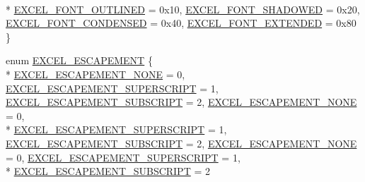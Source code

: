 \begin{DoxyCompactItemize}
\\*
\hyperlink{namespace_excel_format_a667f2d7917ef20f836e5cfec93751d05a2593d75f9c88ca21078192e3bb449d5e}{E\+X\+C\+E\+L\+\_\+\+F\+O\+N\+T\+\_\+\+O\+U\+T\+L\+I\+N\+E\+D} = 0x10, 
\hyperlink{namespace_excel_format_a667f2d7917ef20f836e5cfec93751d05a04f9f154a8b707dc0549db13a4078ec4}{E\+X\+C\+E\+L\+\_\+\+F\+O\+N\+T\+\_\+\+S\+H\+A\+D\+O\+W\+E\+D} = 0x20, 
\hyperlink{namespace_excel_format_a667f2d7917ef20f836e5cfec93751d05a9b5828572d3fdc91a6a4a91789c32602}{E\+X\+C\+E\+L\+\_\+\+F\+O\+N\+T\+\_\+\+C\+O\+N\+D\+E\+N\+S\+E\+D} = 0x40, 
\hyperlink{namespace_excel_format_a667f2d7917ef20f836e5cfec93751d05ac53f1f7b8da98ff92d4a8e91602f4d47}{E\+X\+C\+E\+L\+\_\+\+F\+O\+N\+T\+\_\+\+E\+X\+T\+E\+N\+D\+E\+D} = 0x80
 \}
\item 
enum \hyperlink{namespace_excel_format_a416dbaab3e15b5771ae63a846985407c}{E\+X\+C\+E\+L\+\_\+\+E\+S\+C\+A\+P\+E\+M\+E\+N\+T} \{ \\*
\hyperlink{namespace_excel_format_a416dbaab3e15b5771ae63a846985407ca23fa04d3acf1a8b11238451821947a67}{E\+X\+C\+E\+L\+\_\+\+E\+S\+C\+A\+P\+E\+M\+E\+N\+T\+\_\+\+N\+O\+N\+E} = 0, 
\hyperlink{namespace_excel_format_a416dbaab3e15b5771ae63a846985407ca056e291d587c717a82bdbdc2b030be41}{E\+X\+C\+E\+L\+\_\+\+E\+S\+C\+A\+P\+E\+M\+E\+N\+T\+\_\+\+S\+U\+P\+E\+R\+S\+C\+R\+I\+P\+T} = 1, 
\hyperlink{namespace_excel_format_a416dbaab3e15b5771ae63a846985407ca7328578cb7e58b42577bb67bf4a929b4}{E\+X\+C\+E\+L\+\_\+\+E\+S\+C\+A\+P\+E\+M\+E\+N\+T\+\_\+\+S\+U\+B\+S\+C\+R\+I\+P\+T} = 2, 
\hyperlink{namespace_excel_format_a416dbaab3e15b5771ae63a846985407ca23fa04d3acf1a8b11238451821947a67}{E\+X\+C\+E\+L\+\_\+\+E\+S\+C\+A\+P\+E\+M\+E\+N\+T\+\_\+\+N\+O\+N\+E} = 0, 
\\*
\hyperlink{namespace_excel_format_a416dbaab3e15b5771ae63a846985407ca056e291d587c717a82bdbdc2b030be41}{E\+X\+C\+E\+L\+\_\+\+E\+S\+C\+A\+P\+E\+M\+E\+N\+T\+\_\+\+S\+U\+P\+E\+R\+S\+C\+R\+I\+P\+T} = 1, 
\hyperlink{namespace_excel_format_a416dbaab3e15b5771ae63a846985407ca7328578cb7e58b42577bb67bf4a929b4}{E\+X\+C\+E\+L\+\_\+\+E\+S\+C\+A\+P\+E\+M\+E\+N\+T\+\_\+\+S\+U\+B\+S\+C\+R\+I\+P\+T} = 2, 
\hyperlink{namespace_excel_format_a416dbaab3e15b5771ae63a846985407ca23fa04d3acf1a8b11238451821947a67}{E\+X\+C\+E\+L\+\_\+\+E\+S\+C\+A\+P\+E\+M\+E\+N\+T\+\_\+\+N\+O\+N\+E} = 0, 
\hyperlink{namespace_excel_format_a416dbaab3e15b5771ae63a846985407ca056e291d587c717a82bdbdc2b030be41}{E\+X\+C\+E\+L\+\_\+\+E\+S\+C\+A\+P\+E\+M\+E\+N\+T\+\_\+\+S\+U\+P\+E\+R\+S\+C\+R\+I\+P\+T} = 1, 
\\*
\hyperlink{namespace_excel_format_a416dbaab3e15b5771ae63a846985407ca7328578cb7e58b42577bb67bf4a929b4}{E\+X\+C\+E\+L\+\_\+\+E\+S\+C\+A\+P\+E\+M\+E\+N\+T\+\_\+\+S\+U\+B\+S\+C\+R\+I\+P\+T} = 2

\end{DoxyCompactItemize}
